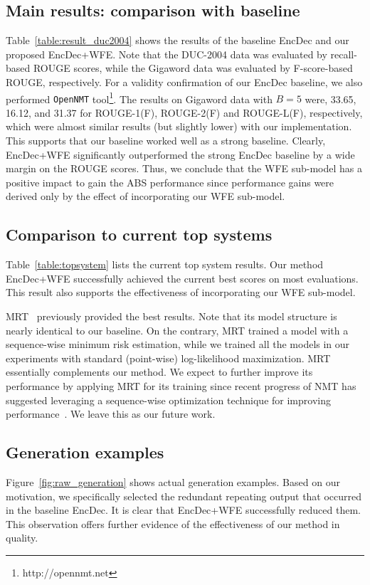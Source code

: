 \documentclass[11pt]{article}
\begin{document}
\subsection{Main results: comparison with baseline}
   Table~\ref{table:result_duc2004} shows the results of the baseline EncDec and our proposed EncDec+WFE.
Note that the DUC-2004 data was evaluated by recall-based ROUGE scores, while the Gigaword data was evaluated by F-score-based ROUGE, respectively.
For a validity confirmation of our EncDec baseline, we also performed {\tt OpenNMT} tool\footnote{{{http://opennmt.net}}}.
    The results on Gigaword data with $B=5$ were, 33.65, 16.12, and 31.37 for ROUGE-1(F), ROUGE-2(F) and ROUGE-L(F), respectively, which were almost similar results (but slightly lower) with our implementation.
This supports that our baseline worked well as a strong baseline.
Clearly, EncDec+WFE significantly outperformed the strong EncDec baseline by a wide margin on the ROUGE scores. 
    Thus, we conclude that the WFE sub-model has a positive impact to gain the ABS performance
   since performance gains were derived only by the effect of incorporating our WFE sub-model. 


\subsection{Comparison to current top systems}
   Table~\ref{table:topsystem} lists the current top system results.
Our method EncDec+WFE successfully achieved the current best scores on most evaluations.
This result also supports the effectiveness of incorporating our WFE sub-model.
   
   MRT~\cite{DBLP:journals/corr/AyanaSLS16} previously provided the best results.
Note that its model structure is nearly identical to our baseline.
On the contrary, MRT trained a model with a sequence-wise minimum risk estimation, while we trained all the models in our experiments with standard (point-wise) log-likelihood maximization.
MRT essentially complements our method.
   We expect to further improve its performance by applying MRT for its training since recent progress of NMT has suggested leveraging a sequence-wise optimization technique for improving performance~\cite{wiseman-rush:2016:EMNLP2016,shen-EtAl:2016:P16-1}.
We leave this as our future work.



\subsection{Generation examples}
Figure~\ref{fig:raw_generation} shows actual generation examples.
Based on our motivation, we specifically selected the redundant repeating output that occurred in the baseline EncDec.
It is clear that EncDec+WFE successfully reduced them.
This observation offers further evidence of the effectiveness of our method in quality.
\end{document}
